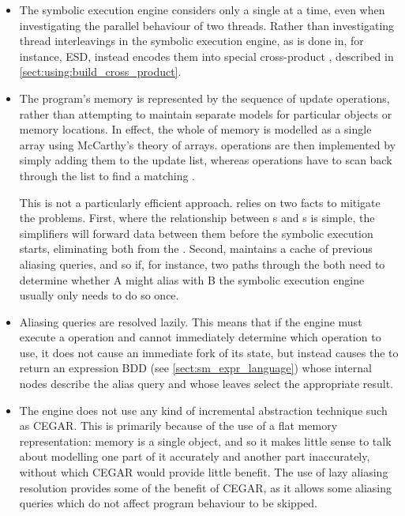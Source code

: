 \begin{itemize}
\item The symbolic execution engine considers only a single
  {\StateMachine} at a time, even when investigating the parallel
  behaviour of two threads.  Rather than investigating thread
  interleavings in the symbolic execution engine, as is done in, for
  instance, ESD\cite{Zamfir2010}, {\technique} instead encodes them
  into special cross-product {\StateMachines}, described in
  \autoref{sect:using:build_cross_product}.

\item The program's memory is represented by the sequence of update
  operations, rather than attempting to maintain separate models for
  particular objects or memory locations.  In effect, the whole of
  memory is modelled as a single array using McCarthy's theory of
  arrays\needCite{}.   operations are then implemented by
  simply adding them to the update list, whereas 
  operations have to scan back through the list to find a matching
  .

  This is not a particularly efficient approach.  {\Implementation}
  relies on two facts to mitigate the problems.  First, where the
  relationship between s and s is simple,  the
  {\StateMachine} simplifiers will forward data between them before
  the symbolic execution starts, eliminating both from the
  {\StateMachine}.  Second, {\implementation} maintains a cache of
  previous aliasing queries, and so if, for instance, two paths
  through the {\StateMachine} both need to determine whether
   A might alias with  B the symbolic
  execution engine usually only needs to do so once.

\item Aliasing queries are resolved lazily.  This means that if the
  engine must execute a  operation and cannot immediately
  determine which  operation to use, it does not cause an
  immediate fork of its state, but instead causes the  to
  return an expression BDD (see \autoref{sect:sm_expr_language}) whose
  internal nodes describe the alias query and whose leaves select the
  appropriate result.

\item The engine does not use any kind of incremental abstraction
  technique such as CEGAR\cite{Clarke2000}.  This is primarily because
  of the use of a flat memory representation: memory is a single
  object, and so it makes little sense to talk about modelling one
  part of it accurately and another part inaccurately, without which
  CEGAR would provide little benefit.  The use of lazy aliasing
  resolution provides some of the benefit of CEGAR, as it allows some
  aliasing queries which do not affect program behaviour to be
  skipped.


\end{itemize}
